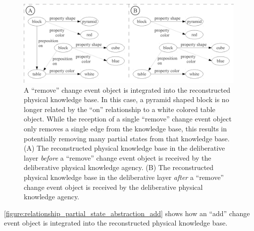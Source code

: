 \begin{figure}
\centering
\includegraphics[width=12cm]{gfx/relationship_partial_state_abstraction_remove}
\caption[A ``remove'' change event object is integrated into the
  reconstructed physical knowledge base.]{A ``remove'' change event
  object is integrated into the reconstructed physical knowledge base.
  In this case, a pyramid shaped block is no longer related by the
  ``on'' relationship to a white colored table object.  While the
  reception of a single ``remove'' change event object only removes a
  single edge from the knowledge base, this results in potentially
  removing many partial states from that knowledge base.  (A) The
  reconstructed physical knowledge base in the deliberative layer
  \emph{before} a ``remove'' change event object is received by the
  deliberative physical knowledge agency.  (B) The reconstructed
  physical knowledge base in the deliberative layer \emph{after} a
  ``remove'' change event object is received by the deliberative
  physical knowledge agency.}
\label{figure:relationship_partial_state_abstraction_remove}
\end{figure}
{\mbox{\autoref{figure:relationship_partial_state_abstraction_add}}}
shows how an ``add'' change event object is integrated into the
reconstructed physical knowledge base.
